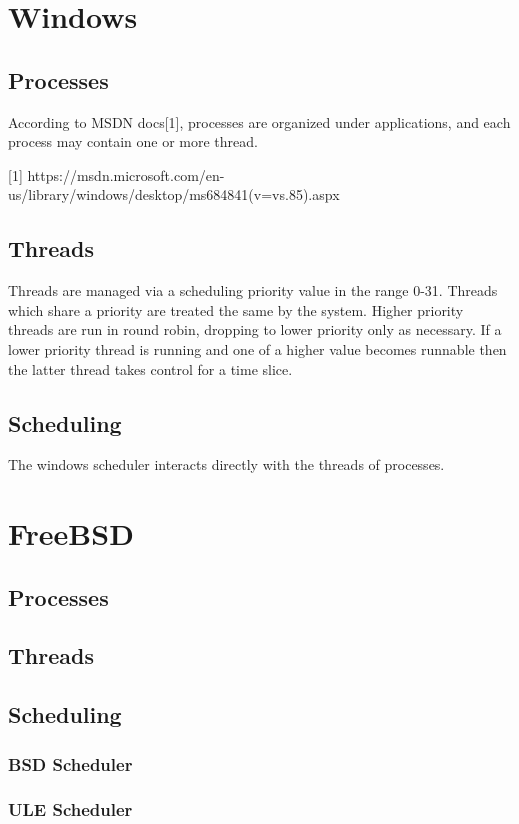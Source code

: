 \documentclass[letterpaper,10pt,notitlepage,fleqn]{article}
\begin{document}
\section{Windows}

\subsection{Processes}

According to MSDN docs[1], processes are organized under applications, and each process may contain one or more thread. 


[1] https://msdn.microsoft.com/en-us/library/windows/desktop/ms684841(v=vs.85).aspx

\subsection{Threads}


Threads are managed via a scheduling priority value in the range 0-31. Threads which share a priority
are treated the same by the system. Higher priority threads are run in round robin, dropping to lower priority only
as necessary. If a lower priority thread is running and one of a higher value becomes runnable then the latter thread
takes control for a time slice. 


\subsection{Scheduling}

The windows scheduler interacts directly with the threads of processes.


\section{FreeBSD}

\subsection{Processes}

\subsection{Threads}

\subsection{Scheduling}

\subsubsection{ BSD Scheduler }

\subsubsection{ ULE Scheduler }
\end{document}
